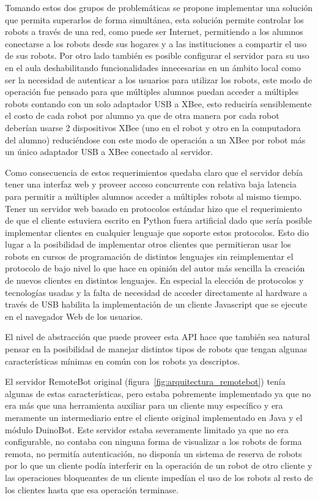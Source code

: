 Tomando estos dos grupos de problemáticas se propone implementar una solución
que permita
superarlos de forma simultánea, esta solución permite controlar los
robots a través de una red, como puede ser Internet, permitiendo a los alumnos
conectarse a los robots desde sus hogares y a las instituciones a compartir
el uso de sus robots. Por otro lado también es posible configurar el servidor
para su uso en el aula deshabilitando funcionalidades innecesarias en un ámbito
local como ser la necesidad de autenticar a los usuarios para utilizar los
robots, este modo de operación fue pensado para que múltiples alumnos puedan
acceder a múltiples robots contando con un solo adaptador USB a XBee, esto
reduciría sensiblemente el costo de cada robot por alumno ya que de otra
manera por cada robot deberían usarse 2 dispositivos XBee (uno en el robot
y otro en la computadora del alumno) reduciéndose con este modo de operación
a un XBee por robot más un único adaptador USB a XBee conectado al servidor.

Como consecuencia de estos requerimientos quedaba claro que el servidor
debía tener una interfaz web y proveer acceso concurrente con relativa
baja latencia para permitir a múltiples alumnos acceder a múltiples robots
al mismo tiempo. Tener un servidor web basado en protocolos estándar hizo
que el requerimiento de que el cliente estuviera escrito en Python fuera
artificial dado que sería posible implementar clientes en cualquier lenguaje
que soporte estos protocolos. Esto dio lugar a la posibilidad de
implementar otros clientes que permitieran usar los robots en cursos
de programación de distintos lenguajes sin reimplementar el protocolo
de bajo nivel lo que hace en opinión del autor más sencilla la creación
de nuevos clientes en distintos lenguajes.
En especial la elección de protocolos y tecnologías usadas
y la falta de necesidad de acceder directamente al hardware a través de USB
habilita la implementación de un cliente Javascript que se ejecute en el
navegador Web de los usuarios.

El nivel de abstracción que puede proveer esta API hace que también sea
natural pensar en la posibilidad de manejar distintos tipos de robots
que tengan algunas características mínimas en común con los robots ya
descriptos.

El servidor RemoteBot original (figura~\ref{fig:arquitectura_remotebot})
tenía algunas de estas características, pero
estaba pobremente implementado ya que no era más que una herramienta auxiliar
para un cliente muy específico y era meramente un intermediario entre el
cliente original implementado en Java y el módulo DuinoBot. Este servidor
estaba severamente limitado
ya que no era configurable, no contaba con ninguna forma de visualizar a los
robots de forma remota, no permitía autenticación, no disponía un sistema
de reserva de robots por lo que un cliente podía interferir en la operación
de un robot de otro cliente y las operaciones bloqueantes de un cliente
impedían el uso de los robots al resto de los clientes hasta que esa operación
terminase.

